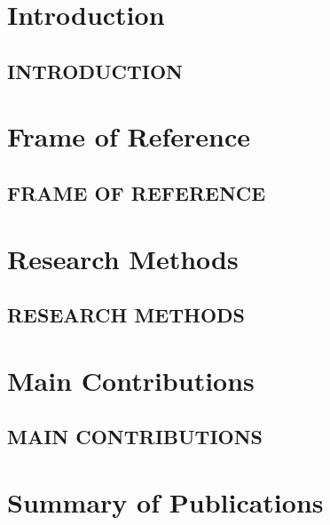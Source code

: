 \documentclass[english]{his-thesis}
\begin{document}


\part*{Introduction}
\label{part:introduction-method}
\mainmatter %

\chapter{INTRODUCTION}
\label{ch:introduction}





\part*{Frame of Reference}
\label{part:frame-of-reference}

\chapter{FRAME OF REFERENCE}
\label{ch:baground}





\part*{Research Methods}
\label{part:method}

\chapter{RESEARCH METHODS}
\label{ch:method}





\part*{Main Contributions}
\label{part:contributions}

\chapter{MAIN CONTRIBUTIONS}
\label{ch:contributions}





\part*{Summary of Publications}
\label{part:summary-publications}
\end{document}
